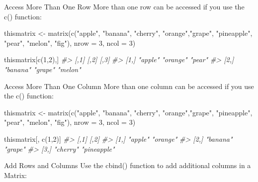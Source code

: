 \documentclass[
]{book}
\newenvironment{Shaded}{\begin{snugshade}}{\end{snugshade}}
\newcommand{\AttributeTok}[1]{\textcolor[rgb]{0.77,0.63,0.00}{#1}}
\newcommand{\CommentTok}[1]{\textcolor[rgb]{0.56,0.35,0.01}{\textit{#1}}}
\newcommand{\DecValTok}[1]{\textcolor[rgb]{0.00,0.00,0.81}{#1}}
\newcommand{\FunctionTok}[1]{\textcolor[rgb]{0.00,0.00,0.00}{#1}}
\newcommand{\NormalTok}[1]{#1}
\newcommand{\OtherTok}[1]{\textcolor[rgb]{0.56,0.35,0.01}{#1}}
\newcommand{\StringTok}[1]{\textcolor[rgb]{0.31,0.60,0.02}{#1}}
\begin{document}
Access More Than One Row
More than one row can be accessed if you use the c() function:

\begin{Shaded}
\begin{Highlighting}[]
\NormalTok{thismatrix }\OtherTok{\textless{}{-}} \FunctionTok{matrix}\NormalTok{(}\FunctionTok{c}\NormalTok{(}\StringTok{"apple"}\NormalTok{, }\StringTok{"banana"}\NormalTok{, }\StringTok{"cherry"}\NormalTok{, }\StringTok{"orange"}\NormalTok{,}\StringTok{"grape"}\NormalTok{, }\StringTok{"pineapple"}\NormalTok{, }\StringTok{"pear"}\NormalTok{, }\StringTok{"melon"}\NormalTok{, }\StringTok{"fig"}\NormalTok{), }\AttributeTok{nrow =} \DecValTok{3}\NormalTok{, }\AttributeTok{ncol =} \DecValTok{3}\NormalTok{)}

\NormalTok{thismatrix[}\FunctionTok{c}\NormalTok{(}\DecValTok{1}\NormalTok{,}\DecValTok{2}\NormalTok{),]}
\CommentTok{\#\textgreater{}      [,1]     [,2]     [,3]   }
\CommentTok{\#\textgreater{} [1,] "apple"  "orange" "pear" }
\CommentTok{\#\textgreater{} [2,] "banana" "grape"  "melon"}
\end{Highlighting}
\end{Shaded}

Access More Than One Column
More than one column can be accessed if you use the c() function:

\begin{Shaded}
\begin{Highlighting}[]
\NormalTok{thismatrix }\OtherTok{\textless{}{-}} \FunctionTok{matrix}\NormalTok{(}\FunctionTok{c}\NormalTok{(}\StringTok{"apple"}\NormalTok{, }\StringTok{"banana"}\NormalTok{, }\StringTok{"cherry"}\NormalTok{, }\StringTok{"orange"}\NormalTok{,}\StringTok{"grape"}\NormalTok{, }\StringTok{"pineapple"}\NormalTok{, }\StringTok{"pear"}\NormalTok{, }\StringTok{"melon"}\NormalTok{, }\StringTok{"fig"}\NormalTok{), }\AttributeTok{nrow =} \DecValTok{3}\NormalTok{, }\AttributeTok{ncol =} \DecValTok{3}\NormalTok{)}

\NormalTok{thismatrix[, }\FunctionTok{c}\NormalTok{(}\DecValTok{1}\NormalTok{,}\DecValTok{2}\NormalTok{)]}
\CommentTok{\#\textgreater{}      [,1]     [,2]       }
\CommentTok{\#\textgreater{} [1,] "apple"  "orange"   }
\CommentTok{\#\textgreater{} [2,] "banana" "grape"    }
\CommentTok{\#\textgreater{} [3,] "cherry" "pineapple"}
\end{Highlighting}
\end{Shaded}

Add Rows and Columns
Use the cbind() function to add additional columns in a Matrix:
\end{document}
